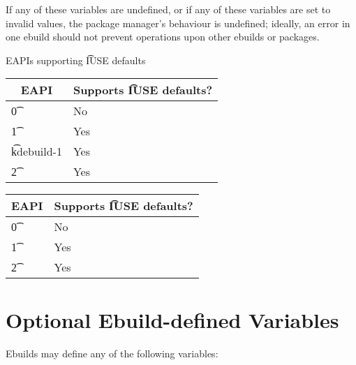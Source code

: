If any of these variables are undefined, or if any of these variables are set to invalid values,
the package manager's behaviour is undefined; ideally, an error in one ebuild should not prevent
operations upon other ebuilds or packages.

\begin{centertable}{EAPIs supporting \t{IUSE} defaults} \label{tab:iuse-defaults-table}
\IFKDEBUILDELSE
{
    \begin{tabular}{ l l }
        \toprule
        \multicolumn{1}{c}{\textbf{EAPI}} &
        \multicolumn{1}{c}{\textbf{Supports \t{IUSE} defaults?}} \\
        \midrule
    \t{0} & No \\
    \t{1} & Yes \\
    \t{kdebuild-1} & Yes \\
    \t{2} & Yes \\
    \bottomrule
    \end{tabular}
}
{
    \begin{tabular}{ l l }
        \toprule
        \multicolumn{1}{c}{\textbf{EAPI}} &
        \multicolumn{1}{c}{\textbf{Supports \t{IUSE} defaults?}} \\
        \midrule
    \t{0} & No \\
    \t{1} & Yes \\
    \t{2} & Yes \\
    \bottomrule
    \end{tabular}
}
\end{centertable}

\section{Optional Ebuild-defined Variables}

Ebuilds may define any of the following variables:

